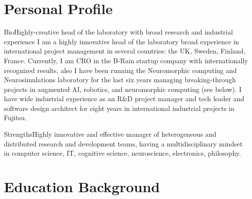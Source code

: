 \documentclass{moderncv}
\begin{document}
%
    \makecvtitle



    \section{Personal Profile}

    \cventry
    {Bio}{Highly-creative head of the laboratory with broad research and industrial experience}{}{}{}
    {I am a highly innovative head of the laboratory broad experience in international project management in several countries: the UK, Sweden, Finland, France. Currently, I am CRO in the B-Rain startup company with internationally recognized results, also I have been running the Neuromorphic computing and Neurosimulations laboratory for the last six years managing breaking-through projects in augmented AI, robotics, and neuromorphic computing (see below).
    I have wide industrial experience as an R\&D project manager and tech leader and software design architect for eight years in international industrial projects in Fujitsu.}

    \cvitem
    {Strengths}{\small Highly innovative and effective manager of heterogeneous and distributed research and development teams, having a multidisciplinary mindset in computer science, IT, cognitive science, neuroscience, electronics, philosophy.}

    \section{Education Background}
\end{document}
